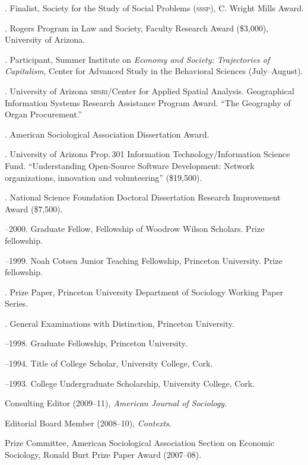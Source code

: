 \documentclass[11pt]{article}
\begin{document}
. Finalist, Society for the Study of Social Problems (\textsc{sssp}), C. Wright Mills Award.

. Rogers Program in Law and Society, Faculty Research Award
(\$3,000), University of Arizona.

. Participant, Summer Institute on \emph{Economy and Society: Trajectories of Capitalism}, Center for Advanced Study in the Behavioral Sciences (July--August).

. University of Arizona \textsc{sbsri}/Center for Applied Spatial
Analysis. Geographical Information Systems Research Assistance
Program Award. ``The Geography of Organ Procurement.''

. American Sociological Association Dissertation Award.

. University of Arizona Prop.\,301 Information Technology/Information Science Fund. ``Understanding Open-Source Software Development: Network organizations, innovation and volunteering'' (\$19,500).

. National Science Foundation Doctoral Dissertation Research Improvement Award (\$7,500).

--2000. Graduate Fellow, Fellowship of Woodrow Wilson Scholars. Prize fellowship.

--1999. Noah Cotsen Junior Teaching Fellowship, Princeton University. Prize fellowship.

. Prize Paper, Princeton University Department of Sociology Working Paper Series.

. General Examinations with Distinction, Princeton University.

--1998. Graduate Fellowship, Princeton University.

--1994. Title of College Scholar, University College, Cork.

--1993. College Undergraduate Scholarship, University
College, Cork.


\bigskip 

\newpage

\medskip

\medskip

\ind Consulting Editor (2009--11), \emph{American Journal of Sociology}.

\ind Editorial Board Member (2008--10), \emph{Contexts}. 

\ind Prize Committee, American Sociological Association Section on Economic Sociology, Ronald Burt Prize Paper Award (2007--08).
\end{document}
